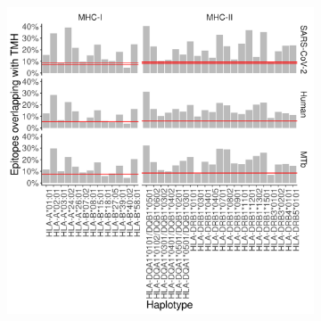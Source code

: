 %
%
\begin{figure}[!htbp]
  \centering
  \begin{subfigure}[t]{0.8\textwidth}
    \centering
    \caption{}
    \includegraphics[width=\linewidth]{bbbq_1_smart_results/fig_f_tmh_2_panel.png}
    \label{fig:bbbq_1_smart_results}
  \end{subfigure}

  \vfill


\end{figure}

